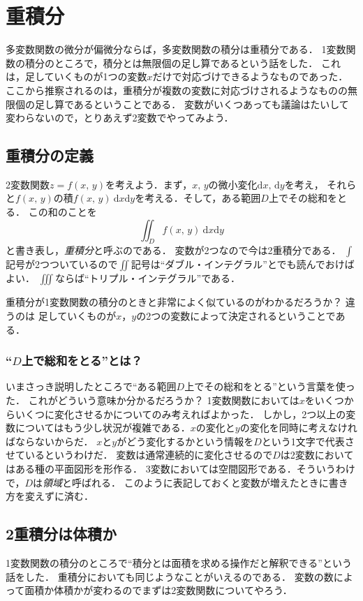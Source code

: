 
\section{重積分}
多変数関数の微分が偏微分ならば，多変数関数の積分は重積分である．
1変数関数の積分のところで，積分とは無限個の足し算であるという話をした．
これは，足していくものが1つの変数$x$だけで対応づけできるようなものであった．
ここから推察されるのは，重積分が複数の変数に対応づけされるようなものの無限個の足し算であるということである．
変数がいくつあっても議論はたいして変わらないので，とりあえず2変数でやってみよう．

\subsection{重積分の定義}
2変数関数$z=f(x, \, y)$を考えよう．まず，$x, \, y$の微小変化$\mathrm{d}x, \, \mathrm{d}y$を考え，
それらと$f(x, \, y)$の積$f(x, \, y) \: \mathrm{d}x\mathrm{d}y$を考える．そして，ある範囲$D$上でその総和をとる．
この和のことを
$$
\iint_{D} f(x, \, y) \: \mathrm{d}x\mathrm{d}y
$$
と書き表し，\emph{重積分}と呼ぶのである．
変数が2つなので今は2重積分である．
$\int$記号が2つついているので$\iint$記号は``ダブル・インテグラル''とでも読んでおけばよい．
$\iiint$ならば``トリプル・インテグラル''である．

重積分が1変数関数の積分のときと非常によく似ているのがわかるだろうか？ 違うのは
足していくものが$x$，$y$の2つの変数によって決定されるということである．

\subsubsection{``$D$上で総和をとる''とは？}
いまさっき説明したところで``ある範囲$D$上でその総和をとる''という言葉を使った．
これがどういう意味か分かるだろうか？ 1変数関数においては$x$をいくつからいくつに変化させるかについてのみ考えればよかった．
しかし，2つ以上の変数についてはもう少し状況が複雑である．$x$の変化と$y$の変化を同時に考えなければならないからだ．
$x$と$y$がどう変化するかという情報を$D$という1文字で代表させているというわけだ．
変数は通常連続的に変化させるので$D$は2変数においてはある種の平面図形を形作る．
3変数においては空間図形である．そういうわけで，$D$は\emph{領域}と呼ばれる．
このように表記しておくと変数が増えたときに書き方を変えずに済む．
\subsection{2重積分は体積か}
1変数関数の積分のところで``積分とは面積を求める操作だと解釈できる''という話をした．
重積分においても同じようなことがいえるのである．
変数の数によって面積か体積かが変わるのでまずは2変数関数についてやろう．

